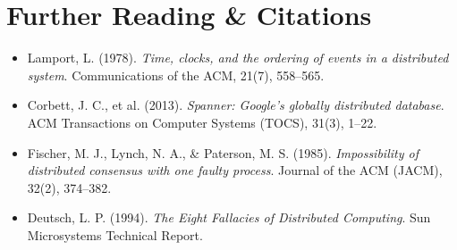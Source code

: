 \section{Further Reading \protect\& Citations}
\begin{itemize}[leftmargin=18pt]
  \item Lamport, L. (1978). \emph{Time, clocks, and the ordering of events in a distributed system}. Communications of the ACM, 21(7), 558--565.
  \item Corbett, J. C., et al. (2013). \emph{Spanner: Google's globally distributed database}. ACM Transactions on Computer Systems (TOCS), 31(3), 1--22.
  \item Fischer, M. J., Lynch, N. A., \& Paterson, M. S. (1985). \emph{Impossibility of distributed consensus with one faulty process}. Journal of the ACM (JACM), 32(2), 374--382.
  \item Deutsch, L. P. (1994). \emph{The Eight Fallacies of Distributed Computing}. Sun Microsystems Technical Report.
\end{itemize}
